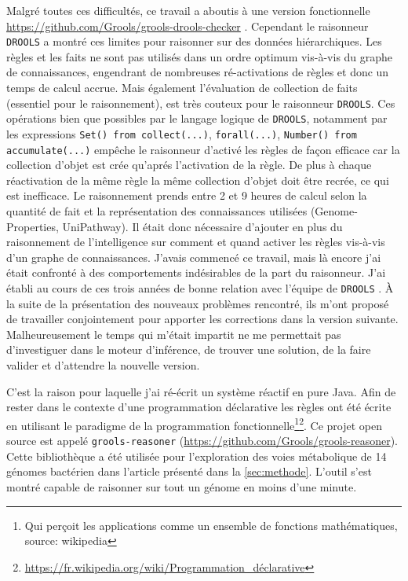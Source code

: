 \begin{refsegment}
Malgré toutes ces difficultés, ce travail a aboutis à une version fonctionnelle \url{https://github.com/Grools/grools-drools-checker} . Cependant le raisonneur \texttt{DROOLS} a montré ces limites pour raisonner sur des données hiérarchiques. Les règles et les faits ne sont pas utilisés dans un ordre optimum vis-à-vis du graphe de connaissances, engendrant de nombreuses ré-activations de règles et donc un temps de calcul accrue. Mais également l'évaluation de collection de faits (essentiel pour le raisonnement), est très couteux pour le raisonneur \texttt{DROOLS}. Ces opérations bien que  possibles par le langage logique de \texttt{DROOLS}, notamment par les expressions \lstinline[style=drl-style]$Set() from collect(...)$, \lstinline[style=drl-style]$forall(...)$, \lstinline[style=drl-style]$Number() from accumulate(...)$ empêche le raisonneur d'activé les règles de façon efficace car la collection d'objet est crée qu'aprés l'activation de la règle. De plus à chaque réactivation de la même règle la même collection d'objet doit être recrée, ce qui est inefficace.  Le raisonnement prends entre 2 et 9 heures de calcul selon la quantité de fait et la représentation des connaissances utilisées (Genome-Properties, UniPathway). Il était donc nécessaire d'ajouter en plus du raisonnement de l'intelligence sur comment et quand activer les règles vis-à-vis d'un graphe de connaissances. J'avais commencé ce travail, mais là encore j'ai était confronté à des comportements indésirables de la part du raisonneur. J'ai établi au cours de ces trois années de bonne relation avec l'équipe de \texttt{DROOLS} . À la suite de la présentation  des nouveaux problèmes rencontré, ils m'ont proposé de travailler conjointement pour apporter les corrections dans la version suivante. Malheureusement le temps qui m'était impartit ne me permettait pas d'investiguer dans le moteur d'inférence, de trouver une solution, de la faire valider et d'attendre la nouvelle version.

C'est la raison pour laquelle j'ai ré-écrit un système réactif en pure Java. Afin de rester dans le contexte d'une programmation déclarative les règles ont été écrite en utilisant le paradigme de la programmation fonctionnelle\footnote{Qui perçoit les applications comme un ensemble de fonctions mathématiques, source: wikipedia}\footnote{\url{https://fr.wikipedia.org/wiki/Programmation_déclarative}}. Ce projet open source est appelé \texttt{grools-reasoner} (\url{https://github.com/Grools/grools-reasoner}). Cette bibliothèque a été utilisée pour l'exploration des voies métabolique de 14 génomes bactérien dans l'article présenté dans la  \cref{sec:methode}. L'outil s'est montré capable de raisonner sur tout un génome en moins d'une minute.


\end{refsegment}
